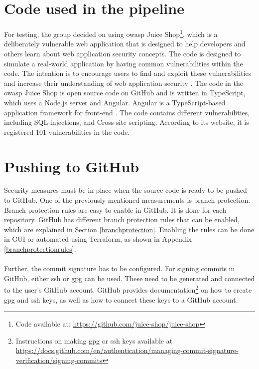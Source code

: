 \section{Code used in the pipeline}
For testing, the group decided on using \acrshort{owasp} Juice Shop\footnote{Code available at: \url{https://github.com/juice-shop/juice-shop}}, which is a deliberately vulnerable web application that is designed to help developers and others learn about web application security concepts. The code is designed to simulate a real-world application by having common vulnerabilities within the code. The intention is to encourage users to find and exploit these vulnerabilities and increase their understanding of web application security \cite{owaspJuiceShop}. The code in the \acrshort{owasp} Juice Shop is open source code on GitHub and is written in TypeScript, which uses a Node.js server and Angular. Angular is a TypeScript-based application framework for \gls{front-end} \cite{owaspJuiceShopCode}. The code contains different vulnerabilities, including \gls{SQL-injection}s, and \gls{Cross-site scripting}. According to its website, it is registered 101 vulnerabilities in the code.

\section{Pushing to GitHub}
Security measures must be in place when the source code is ready to be pushed to GitHub. One of the previously mentioned measurements is branch protection. Branch protection rules are easy to enable in GitHub. It is done for each repository. GitHub has different branch protection rules that can be enabled, which are explained in Section \ref{branchprotection}. Enabling the rules can be done in \gls{GUI} or automated using Terraform, as shown in Appendix \ref{branchprotectionrules}. 
\\~\\
Further, the commit signature has to be configured. For signing commits in GitHub, either \acrshort{ssh} or \acrshort{gpg} can be used. These need to be generated and connected to the user's GitHub account. GitHub provides documentation\footnote{Instructions on making \acrshort{gpg} or \acrshort{ssh} keys available at \url{https://docs.github.com/en/authentication/managing-commit-signature-verification/signing-commits}} on how to create \acrshort{gpg} and \acrshort{ssh} keys, as well as how to connect these keys to a GitHub account.

